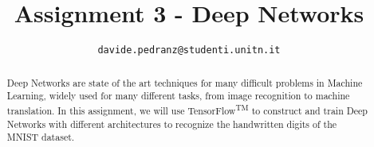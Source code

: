 \documentclass[conference]{IEEEtran}
\begin{document}
\title{Assignment 3 - Deep Networks}
\author{
	\texttt{davide.pedranz@studenti.unitn.it}
}

\maketitle

\begin{abstract}
Deep Networks are state of the art techniques for many difficult problems in Machine Learning, widely used for many different tasks, from image recognition to machine translation.
In this assignment, we will use TensorFlow\textsuperscript{TM} to construct and train Deep Networks with different architectures to recognize the handwritten digits of the MNIST dataset.
\end{abstract}

\acresetall















\end{document}
